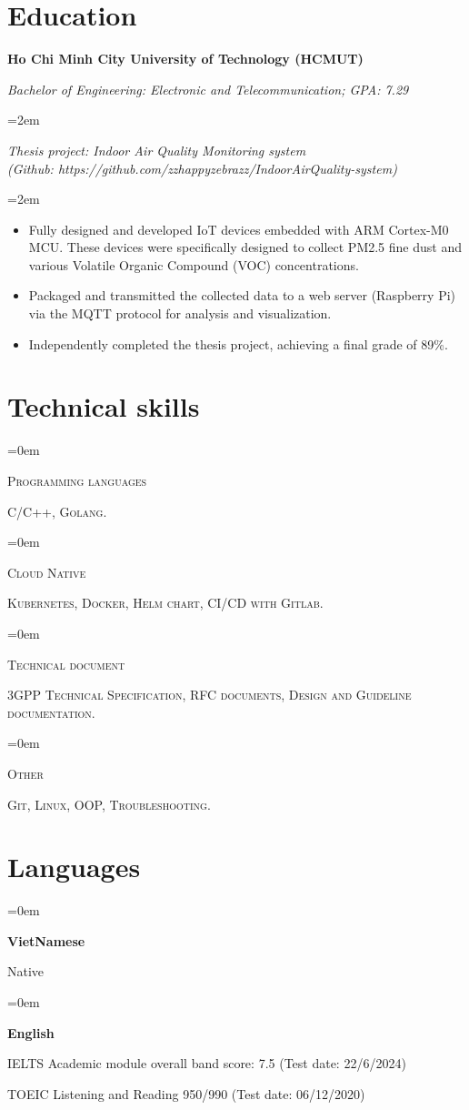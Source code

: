 \documentclass[10pt]{article}
\newlength{\spacebox}
\newcommand{\skill}[2]{
\noindent\hangindent=0em\hangafter=0
\parbox{3\spacebox}{%
\textsc{#1}} %
#2 \par} %
\newcommand{\lan}[2]{
    \noindent\hangindent=0em\hangafter=0
    \parbox{3\spacebox}{%
        \textbf{#1}} %
     #2 \par}    %
\newcommand{\education}[4]{

  \noindent  \textbf{#1}
    \hfill 
    \framebox{%
    \parbox{9em}{%
    \centering\textbf{#2}}} \par
     \noindent \textit{#3} \par
     \vspace*{0.5em}
     \noindent\hangindent=2em\hangafter=0 \small #4 
\normalsize \par}
\newcommand{\project}[3]{
  \noindent \textbf{#1} \par
  \noindent \textit{#2} \par
  \vspace*{0.5em}
  \noindent\hangindent=2em\hangafter=0 \small #3
  \normalsize \par
}
\begin{document}
\section*{Education}
\education{Ho Chi Minh City University of Technology (HCMUT)}
{Aug 2017--Nov 2021}
{Bachelor of Engineering: Electronic and Telecommunication; GPA: 7.29}
{}
\project{}
{Thesis project: Indoor Air Quality Monitoring system \\(Github: https://github.com/zzhappyzebrazz/IndoorAirQuality-system)}
{
  \begin{itemize}
    \item Fully designed and developed IoT devices embedded with ARM Cortex-M0 MCU. 
     These devices were specifically designed to collect PM2.5 fine dust and various Volatile Organic Compound (VOC) concentrations.
     \item Packaged and transmitted the collected data to a web server (Raspberry Pi) via the MQTT protocol for analysis and visualization.
     \item Independently completed the thesis project, achieving a final grade of 89\%.
  \end{itemize}
}
{}

\section*{Technical skills}
\skill{Programming languages}{\textsc{C/C++}, \textsc{Golang}.}
\skill{Cloud Native}{\textsc{Kubernetes, Docker, Helm chart, CI/CD with Gitlab.}}
\skill{Technical document}{\textsc{3GPP Technical Specification, RFC documents, Design and Guideline documentation.}}
\skill{Other}{\textsc{Git, Linux, OOP, Troubleshooting.}}

\section*{Languages}
\lan{VietNamese}{Native}
\lan{English}{IELTS Academic module overall band score: 7.5 (Test date: 22/6/2024)

\hspace{4.2cm} TOEIC Listening and Reading 950/990 (Test date: 06/12/2020)}
\end{document}

